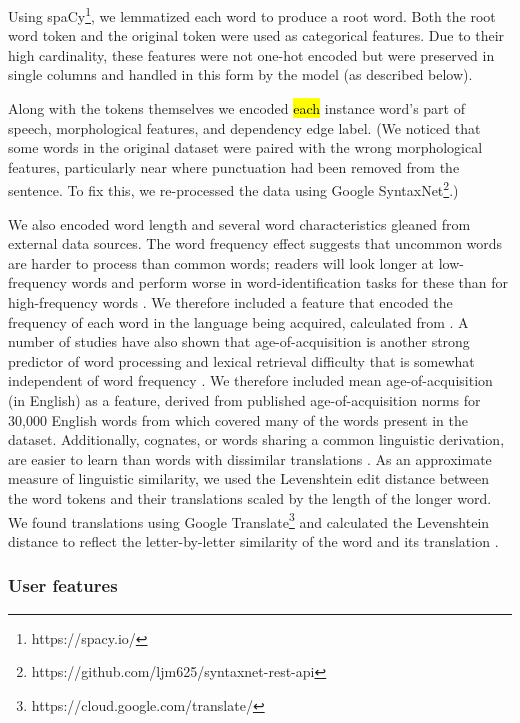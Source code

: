 \documentclass[11pt,a4paper]{article}
\begin{document}
Using spaCy\footnote{https://spacy.io/}, we lemmatized each word to produce a root word. Both the root
word token and the original token were used as categorical features. Due to
their high cardinality, these features were not one-hot encoded but were
preserved in single columns and handled in this form by the model (as described
below).

Along with the tokens themselves we encoded \hl{each} instance word's part of speech,
morphological features, and dependency edge label. (We noticed that some words
in the original dataset were paired with the wrong morphological features,
particularly near where punctuation had been removed from the sentence. To fix
this, we re-processed the data using Google SyntaxNet\footnote{https://github.com/ljm625/syntaxnet-rest-api}.)

We also encoded word length and several word characteristics gleaned from
external data sources. The word frequency effect suggests that uncommon words are harder to process than common words; readers will look longer at low-frequency words and perform worse in word-identification tasks for these than for high-frequency words \cite{rayner1998eye}. We therefore included a feature that encoded the frequency of each word in the language being acquired, calculated from \citet{robert_speer_2017_998161}. A number of studies have also shown that age-of-acquisition is another strong predictor of word processing and lexical retrieval difficulty that is somewhat independent of word frequency \cite{brysbaert2011effects, ferrand2011comparing}. We therefore included mean age-of-acquisition (in English) as a feature, derived from published age-of-acquisition norms for 30,000 English words from \cite{Kuperman2012} which covered many of the words present in the dataset. Additionally, cognates, or words sharing a common linguistic derivation, are easier to learn than words with dissimilar translations \cite{de2000hard}. As an approximate measure of linguistic similarity, we used the Levenshtein edit distance between the word tokens and their translations scaled by the length of the longer word. We found translations using Google Translate\footnote{https://cloud.google.com/translate/} and calculated the Levenshtein distance to reflect the letter-by-letter similarity of the word and its translation \cite{hyyro2001explaining}. 
\subsubsection{User features}
\end{document}
